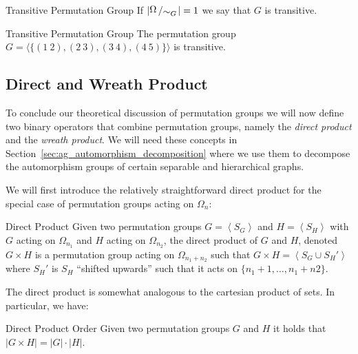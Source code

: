 \begin{defn}{Transitive Permutation Group}
  If $|\bigslant{\Omega}{\sim_G}| = 1$ we say that $G$ is transitive.
\end{defn}

\begin{exmp}{Transitive Permutation Group}
  The permutation group $G = \langle \{(1\ 2),(2\ 3),(3\ 4),(4\ 5)\} \rangle$
  is transitive.
\end{exmp}

\subsection{Direct and Wreath Product}
\label{sec:pg_direct_and_wreath_product}

To conclude our theoretical discussion of permutation groups we will now define
two binary operators that combine permutation groups, namely the \textit{direct
product} and the \textit{wreath product}. We will need these concepts in
Section~\ref{sec:ag_automorphism_decomposition} where we use them to decompose
the automorphism groups of certain separable and hierarchical graphs.

We will first introduce the relatively straightforward direct product for the
special case of permutation groups acting on $\Omega_n$:

\begin{defn}[label=defn:direct_product]{Direct Product}
  Given two permutation groups $G = \left<S_G\right>$ and $H = \left<S_H\right>$
  with $G$ acting on $\Omega_{n_1}$ and $H$ acting on $\Omega_{n_2}$, the direct
  product of $G$ and $H$, denoted $G \times H$ is a permutation group acting on
  $\Omega_{n_1 + n_2}$ such that $G \times H = \left<S_G \cup S_H'\right>$ where
  $S_H'$ is $S_H$ ``shifted upwards'' such that it acts on $\{n_1 + 1, \dots, n_1
  + n2\}$.
\end{defn}
%
The direct product is somewhat analogous to the cartesian product of sets.
In particular, we have:

\begin{lemma}{Direct Product Order}
  Given two permutation groups $G$ and $H$ it holds that $|G \times H| = |G|
  \cdot |H|$.
\end{lemma}

